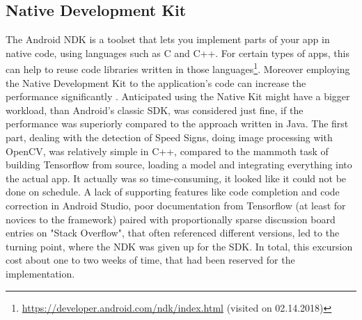 \subsection{Native Development Kit}
The Android NDK is a toolset that lets you implement parts of your app in native code, using languages such as C and C++. For certain types of apps, this can help to reuse code libraries written in those languages\footnote{\url{https://developer.android.com/ndk/index.html} (visited on 02.14.2018)}. Moreover employing the Native Development Kit to the application's code can increase the performance significantly  \cite{ndkspeed}. Anticipated using the Native Kit might have a bigger workload, than Android's classic SDK, was considered just fine, if the performance was superiorly compared to the approach written in Java. \newline
The first part, dealing with the detection of Speed Signs, doing image processing with OpenCV,  was relatively simple in C++, compared to the mammoth task of building Tensorflow from source, loading a model and integrating everything into the actual app. It actually was so time-consuming, it looked like it could not be done on schedule. A lack of supporting features like code completion and code correction in Android Studio, poor documentation from Tensorflow (at least for novices to the framework) paired with proportionally sparse discussion board entries on "Stack Overflow", that often referenced different versions, led to the turning point, where the NDK was given up for the SDK. In total, this excursion cost about one to two weeks of time, that had been reserved for the implementation. 

